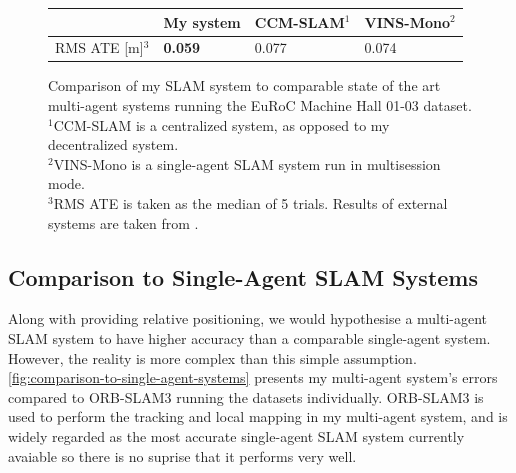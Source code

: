 \begin{figure}[h]
    \centering
    \def\arraystretch{1.2}
    \begin{tabular}{ |l|l|l|l| }
        \cline{2-4}
        \multicolumn{1}{c|}{} & My system      & CCM-SLAM$^1$ & VINS-Mono$^2$ \\
        \hline
        RMS ATE [m]$^3$       & \textbf{0.059} & 0.077        & 0.074         \\
        \hline
    \end{tabular}

    \caption{Comparison of my SLAM system to comparable state of the art multi-agent systems running the EuRoC Machine Hall 01-03 dataset. \captionbreak $^1$CCM-SLAM is a centralized system, as opposed to my decentralized system. \\ $^2$VINS-Mono is a single-agent SLAM system run in multisession mode. \\ $^3$RMS ATE is taken as the median of 5 trials. Results of external systems are taken from \autocite{schmuck2019ccm}.}
    \label{fig:comparison-to-multi-agent-systems}
\end{figure}

\subsection{Comparison to Single-Agent SLAM Systems}
Along with providing relative positioning, we would hypothesise a multi-agent SLAM system to have higher accuracy than a comparable single-agent system. However, the reality is more complex than this simple assumption. \autoref{fig:comparison-to-single-agent-systems} presents my multi-agent system's errors compared to ORB-SLAM3 running the datasets individually. ORB-SLAM3 is used to perform the tracking and local mapping in my multi-agent system, and is widely regarded as the most accurate single-agent SLAM system currently avaiable so there is no suprise that it performs very well.

